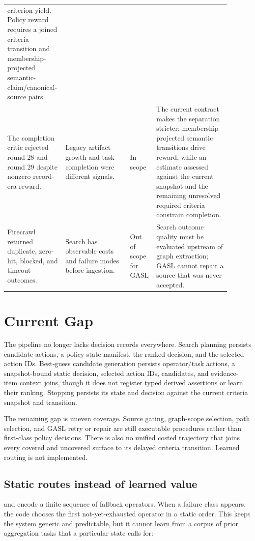 \documentclass[11pt]{article}
\newcommand{\code}[1]{\path{#1}}
\begin{document}
\begin{longtable}{@{}p{0.19\linewidth}p{0.28\linewidth}p{0.11\linewidth}p{0.32\linewidth}@{}}
criterion yield.  Policy reward requires a joined criteria transition and
membership-projected semantic-claim/canonical-source pairs. \\
\addlinespace
The completion critic rejected round 28 and round 29 despite nonzero
record-era reward. &
Legacy artifact growth and task completion were different signals. &
In scope &
The current contract makes the separation stricter: membership-projected
semantic transitions drive reward, while an estimate assessed against the current snapshot and
the remaining unresolved required criteria constrain completion. \\
\addlinespace
Firecrawl returned duplicate, zero-hit, blocked, and timeout outcomes. &
Search has observable costs and failure modes before ingestion. &
Out of scope for GASL &
Search outcome quality must be evaluated upstream of graph extraction; GASL
cannot repair a source that was never accepted. \\
\end{longtable}

\section{Current Gap}

The pipeline no longer lacks decision records everywhere.  Search planning
persists candidate actions, a policy-state manifest, the ranked decision, and
the selected action IDs.  Best-guess candidate generation persists operator/task
actions, a snapshot-bound static decision, selected action IDs, candidates,
and evidence-item context joins, though it does not register typed derived
assertions or learn their ranking.  Stopping persists its state and decision
against the current criteria snapshot and transition.

The remaining gap is uneven coverage.  Source gating, graph-scope selection,
path selection, and GASL retry or repair are still executable procedures rather
than first-class policy decisions.  There is also no unified costed trajectory
that joins every covered and uncovered surface to its delayed criteria
transition.  Learned routing is not implemented.

\subsection{Static routes instead of learned value}

\code{plan_target_operator()} and \code{plan_catalog_operator()} encode a
finite sequence of fallback operators.  When a failure class appears, the code
chooses the first not-yet-exhausted operator in a static order.  This keeps the
system generic and predictable, but it cannot learn from a corpus of prior
aggregation tasks that a particular state calls for:
\end{document}
